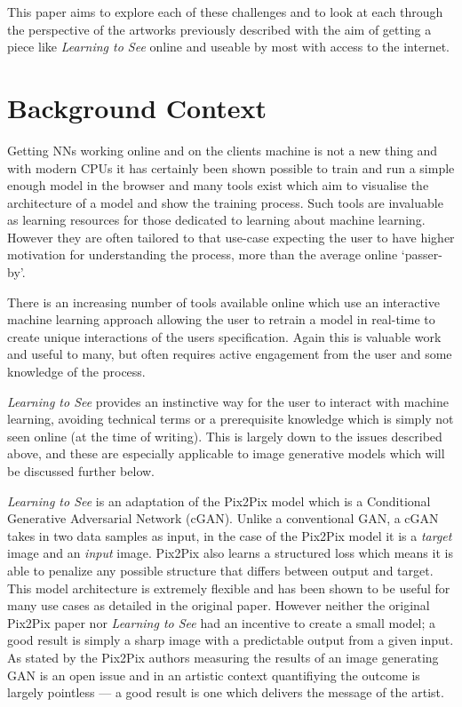 \documentclass{article}
\begin{document}
This paper aims to explore each of these challenges and to look at each through the perspective of the artworks previously described with the aim of getting a piece like \textit{Learning to See} online and useable by most with access to the internet.


\section{Background Context}

Getting NNs working online and on the clients machine is not a new thing and with modern CPUs it has certainly been shown possible to train and run a simple enough model in the browser\cite{karparthy_conjs_2016, brainjs, synaptic, mind, kerasjs} and many tools exist which aim to visualise the architecture of a model and show the training process\cite{broad_cnn_vis_2016, tensorflow_playground, 1704.01942}. Such tools are invaluable as learning resources for those dedicated to learning about machine learning. However they are often tailored to that use-case expecting the user to have higher motivation for understanding the process, more than the average online `passer-by'.

There is an increasing number of tools available online which use an interactive machine learning approach allowing the user to retrain a model in real-time to create unique interactions of the users specification\cite{magenta, mimic, teachablemachines}. Again this is valuable work and useful to many, but often requires active engagement from the user and some knowledge of the process.

\textit{Learning to See} provides an instinctive way for the user to interact with machine learning, avoiding technical terms or a prerequisite knowledge which is simply not seen online (at the time of writing). This is largely down to the issues described above, and these are especially applicable to image generative models which will be discussed further below.

\textit{Learning to See} is an adaptation of the Pix2Pix model\cite{1611.07004} which is a Conditional Generative Adversarial Network (cGAN)\cite{1701.00160}. Unlike a conventional GAN\cite{1406.2661}, a cGAN takes in two data samples as input, in the case of the Pix2Pix model it is a \textit{target} image and an \textit{input} image. Pix2Pix also learns a structured loss which means it is able to penalize any possible structure that differs between output and target\cite{1611.07004}. This model architecture is extremely flexible and has been shown to be useful for many use cases as detailed in the original paper. However neither the original Pix2Pix paper nor \textit{Learning to See} had an incentive to create a small model; a good result is simply a sharp image with a predictable output from a given input. As stated by the Pix2Pix authors measuring the results of an image generating GAN is an open issue\cite{1606.03498, 1611.07004} and in an artistic context quantifiying the outcome is largely pointless --- a good result is one which delivers the message of the artist.
\end{document}
